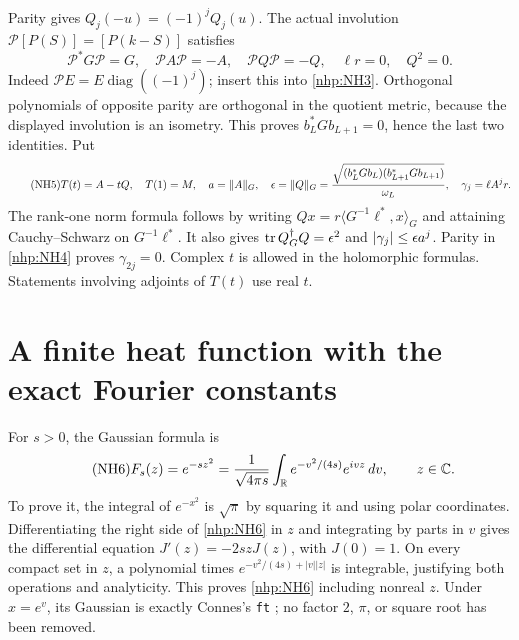 Parity gives \(Q_j(-u)=(-1)^jQ_j(u)\).
The actual involution \(\mathcal P[P(S)]=[P(k-S)]\)
satisfies
\begin{equation}\tag{NH4}\label{nhp:NH4}
\mathcal P^*G\mathcal P=G,\quad
\mathcal P A\mathcal P=-A,\quad
\mathcal P Q\mathcal P=-Q,\quad
\ell r=0,\quad Q^2=0 .
\end{equation}
Indeed \(\mathcal P E=E\operatorname{diag}((-1)^j)\);
insert this into \eqref{nhp:NH3}. Orthogonal polynomials of
opposite parity are orthogonal in the quotient metric,
because the displayed involution is an isometry.
This proves \(b_L^*Gb_{L+1}=0\), hence the last two
identities. Put
\begin{equation}\tag{NH5}\label{nhp:NH5}
T(t)=A-tQ,\quad T(1)=M,\quad
a=\|A\|_G,\quad
\epsilon=\|Q\|_G
=\frac{\sqrt{(b_L^*Gb_L)(b_{L+1}^*Gb_{L+1})}}{\omega_L},
\quad \gamma_j=\ell A^jr .
\end{equation}
The rank-one norm formula follows by writing
\(Qx=r\langle G^{-1}\ell^*,x\rangle_G\) and attaining
Cauchy--Schwarz on \(G^{-1}\ell^*\). It also gives
\(\operatorname{tr} Q^\dagger_G Q=\epsilon^2\) and
\(|\gamma_j|\le\epsilon a^j\).
Parity in \eqref{nhp:NH4} proves \(\gamma_{2j}=0\).
Complex \(t\) is allowed in the holomorphic formulas.
Statements involving adjoints of \(T(t)\) use real \(t\).

\section{A finite heat function with the exact Fourier constants}

For \(s>0\), the Gaussian formula is
\begin{equation}\tag{NH6}\label{nhp:NH6}
F_s(z)=e^{-sz^2}
=\frac1{\sqrt{4\pi s}}\int_\mathbb R e^{-v^2/(4s)}e^{ivz}\,dv,
\qquad z\in\mathbb C .
\end{equation}
To prove it, the integral of \(e^{-x^2}\) is \(\sqrt\pi\)
by squaring it and using polar coordinates. Differentiating
the right side of \eqref{nhp:NH6} in \(z\) and integrating
by parts in \(v\) gives the differential equation
\(J'(z)=-2szJ(z)\), with \(J(0)=1\).
On every compact set in \(z\), a polynomial times
\(e^{-v^2/(4s)+|v||z|}\) is integrable, justifying both
operations and analyticity. This proves \eqref{nhp:NH6}
including nonreal \(z\). Under \(x=e^v\), its Gaussian
is exactly Connes's \texttt{ft} \cite{nhp:ConnesHeat};
no factor \(2\), \(\pi\), or square root has been removed.

